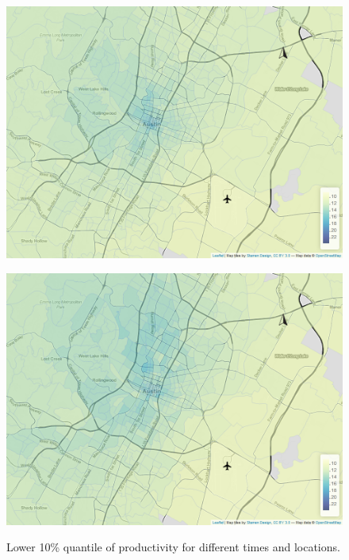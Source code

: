 \documentclass[a4paper, 11pt]{article}
\begin{document}
\begin{figure}[tb]
\begin{minipage}[tb]{.48\linewidth}
        \centering
        \includegraphics[width=\linewidth]{img/quantile_142_1.png}
        \label{fig:quantiles:0.1:c}
    \end{minipage}
    \begin{minipage}[tb]{0.48\linewidth}
        \centering
        \includegraphics[width=\linewidth]{img/quantile_168_1.png}
        \label{fig:quantiles:0.1:d}
    \end{minipage}
    \caption{Lower 10\% quantile of productivity for different times and locations.}
    \label{fig:quantiles:0.1}
\end{figure}
\end{document}
